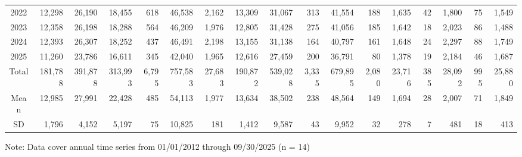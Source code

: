 \begin{table}
\begin{tabular}{crrrrrrrrrrrrrrrr}
2022 & 12,298 & 26,190 & 18,455 & 618 & 46,538 & 2,162 & 13,309 & 31,067 & 313 & 41,554 & 188 & 1,635 & 42 & 1,800 & 75 & 1,549 \\
2023 & 12,358 & 26,198 & 18,288 & 564 & 46,209 & 1,976 & 12,805 & 31,428 & 275 & 41,056 & 185 & 1,642 & 18 & 2,023 & 86 & 1,488 \\
2024 & 12,393 & 26,307 & 18,252 & 437 & 46,491 & 2,198 & 13,155 & 31,138 & 164 & 40,797 & 161 & 1,648 & 24 & 2,297 & 88 & 1,749 \\
2025 & 11,260 & 23,786 & 16,611 & 345 & 42,040 & 1,965 & 12,616 & 27,459 & 200 & 36,791 & 80 & 1,378 & 19 & 2,184 & 46 & 1,687 \\
\midrule
Total & 181,788 & 391,878 & 313,993 & 6,795 & 757,583 & 27,683 & 190,872 & 539,028 & 3,335 & 679,895 & 2,080 & 23,716 & 385 & 28,092 & 995 & 25,880 \\
Mean & 12,985 & 27,991 & 22,428 & 485 & 54,113 & 1,977 & 13,634 & 38,502 & 238 & 48,564 & 149 & 1,694 & 28 & 2,007 & 71 & 1,849 \\
SD & 1,796 & 4,152 & 5,197 & 75 & 10,825 & 181 & 1,412 & 9,587 & 43 & 9,952 & 32 & 278 & 7 & 481 & 18 & 413 \\
\bottomrule
\end{tabular}
\footnotesize{Note: Data cover annual time series from 01/01/2012 through 09/30/2025 (n = 14)}
\end{table}
